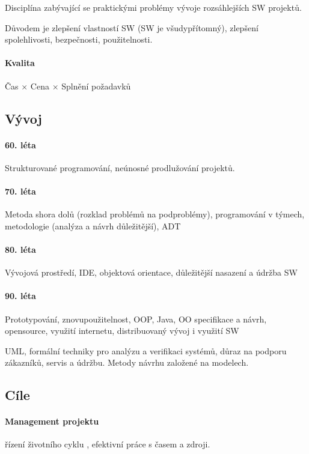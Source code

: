 \documentclass[a4paper, 11pt]{report}
\begin{document}
Disciplína zabývající se praktickými problémy vývoje rozsáhlejších SW projektů.

Důvodem je zlepšení vlastností SW (SW je všudypřítomný), zlepšení spolehlivosti, bezpečnosti, použitelnosti.

\paragraph{Kvalita} Čas $\times$ Cena $\times$ Splnění požadavků

\subsection{Vývoj}
\paragraph{60. léta} Strukturované programování, neúnosné prodlužování projektů.

\paragraph{70. léta} Metoda shora dolů (rozklad problémů na podproblémy), programování v týmech, metodologie (analýza a návrh důležitější), ADT

\paragraph{80. léta} Vývojová prostředí, IDE, objektová orientace, důležitější nasazení a údržba SW

\paragraph{90. léta} Prototypování, znovupoužitelnost, OOP, Java, OO specifikace a návrh, opensource, využití internetu, distribuovaný vývoj i využití SW

UML, formální techniky pro analýzu a verifikaci systémů, důraz na podporu zákazníků, servis a údržbu. Metody návrhu založené na modelech.

\subsection{Cíle}
\paragraph{Management projektu} řízení životního cyklu , efektivní práce s časem a zdroji.
\end{document}
